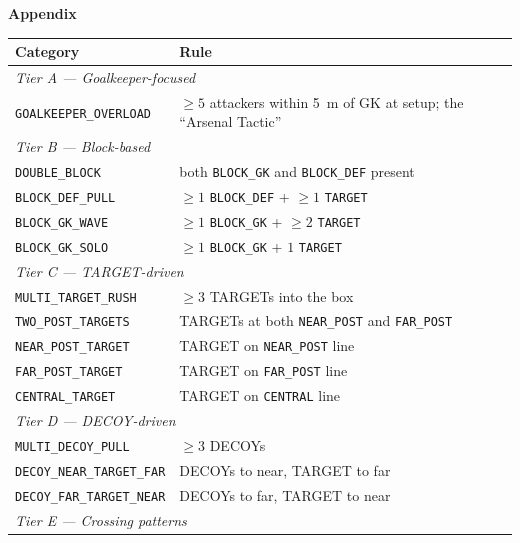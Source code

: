 \textbf{Appendix}
\begin{table}[h!]
  \centering

  \label{tab:tactical_categories}
  \begin{tabular}{p{5cm} p{8.6cm}}
    \toprule
    \textbf{Category} & \textbf{Rule} \\
    \midrule
    \multicolumn{2}{l}{\emph{Tier A — Goalkeeper-focused}} \\
    \texttt{GOALKEEPER\_OVERLOAD} & $\geq 5$ attackers within 5~m of GK at setup; the
                                ``Arsenal Tactic'' \\
    \midrule
    \multicolumn{2}{l}{\emph{Tier B — Block-based}} \\
    \texttt{DOUBLE\_BLOCK} & both \texttt{BLOCK\_GK} and \texttt{BLOCK\_DEF}
                                  present \\
    \texttt{BLOCK\_DEF\_PULL} & $\geq 1$ \texttt{BLOCK\_DEF} + $\geq 1$
                                  \texttt{TARGET} \\
    \texttt{BLOCK\_GK\_WAVE} & $\geq 1$ \texttt{BLOCK\_GK} + $\geq 2$
                                  \texttt{TARGET} \\
    \texttt{BLOCK\_GK\_SOLO} & $\geq 1$ \texttt{BLOCK\_GK} + $1$
                                  \texttt{TARGET} \\
    \midrule
    \multicolumn{2}{l}{\emph{Tier C — TARGET-driven}} \\
    \texttt{MULTI\_TARGET\_RUSH} & $\geq 3$ TARGETs into the box \\
    \texttt{TWO\_POST\_TARGETS}  & TARGETs at both \texttt{NEAR\_POST} and
                                  \texttt{FAR\_POST} \\
    \texttt{NEAR\_POST\_TARGET}  & TARGET on \texttt{NEAR\_POST} line \\
    \texttt{FAR\_POST\_TARGET}   & TARGET on \texttt{FAR\_POST} line \\
    \texttt{CENTRAL\_TARGET}     & TARGET on \texttt{CENTRAL} line \\
    \midrule
    \multicolumn{2}{l}{\emph{Tier D — DECOY-driven}} \\
    \texttt{MULTI\_DECOY\_PULL}      & $\geq 3$ DECOYs \\
    \texttt{DECOY\_NEAR\_TARGET\_FAR} & DECOYs to near, TARGET to far \\
    \texttt{DECOY\_FAR\_TARGET\_NEAR} & DECOYs to far, TARGET to near \\
    \midrule
    \multicolumn{2}{l}{\emph{Tier E — Crossing patterns}} \\

\end{tabular}
\end{table}
